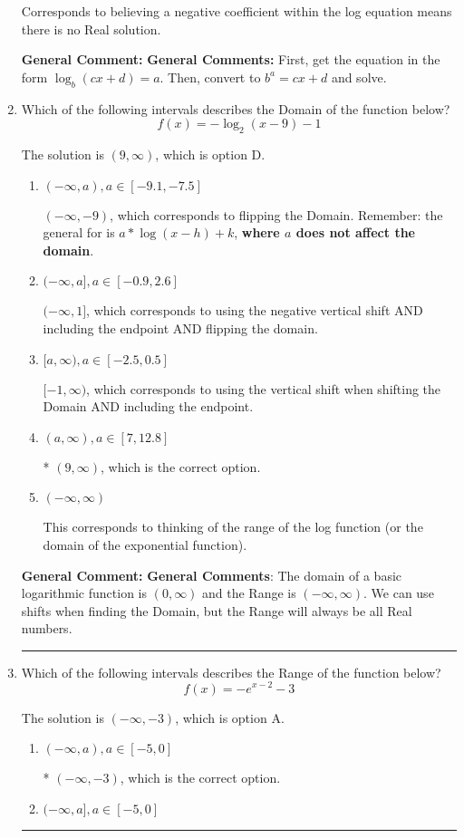 \documentclass{extbook}[14pt]
\newcommand{\litem}[1]{\item #1

\rule{\textwidth}{0.4pt}}
\begin{document}
\begin{enumerate}
{\begin{enumerate}[label=\Alph*.]
Corresponds to believing a negative coefficient within the log equation means there is no Real solution.
\end{enumerate}

\textbf{General Comment:} \textbf{General Comments:} First, get the equation in the form $\log_b{(cx+d)} = a$. Then, convert to $b^a = cx+d$ and solve.
}
\litem{
Which of the following intervals describes the Domain of the function below?
\[ f(x) = -\log_2{(x-9)}-1 \]

The solution is \( (9, \infty) \), which is option D.\begin{enumerate}[label=\Alph*.]
\item \( (-\infty, a), a \in [-9.1, -7.5] \)

$(-\infty, -9)$, which corresponds to flipping the Domain. Remember: the general for is $a*\log(x-h)+k$, \textbf{where $a$ does not affect the domain}.
\item \( (-\infty, a], a \in [-0.9, 2.6] \)

$(-\infty, 1]$, which corresponds to using the negative vertical shift AND including the endpoint AND flipping the domain.
\item \( [a, \infty), a \in [-2.5, 0.5] \)

$[-1, \infty)$, which corresponds to using the vertical shift when shifting the Domain AND including the endpoint.
\item \( (a, \infty), a \in [7, 12.8] \)

* $(9, \infty)$, which is the correct option.
\item \( (-\infty, \infty) \)

This corresponds to thinking of the range of the log function (or the domain of the exponential function).
\end{enumerate}

\textbf{General Comment:} \textbf{General Comments}: The domain of a basic logarithmic function is $(0, \infty)$ and the Range is $(-\infty, \infty)$. We can use shifts when finding the Domain, but the Range will always be all Real numbers.
}
\litem{
Which of the following intervals describes the Range of the function below?
\[ f(x) = -e^{x-2}-3 \]

The solution is \( (-\infty, -3) \), which is option A.\begin{enumerate}[label=\Alph*.]
\item \( (-\infty, a), a \in [-5, 0] \)

* $(-\infty, -3)$, which is the correct option.
\item \( (-\infty, a], a \in [-5, 0] \)


\end{enumerate}}
\end{enumerate}
\end{document}
